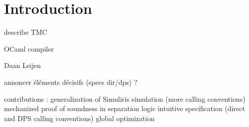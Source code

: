 \section{Introduction}

describe TMC

OCaml compiler

Daan Leijen

annoncer éléments décisifs (specs dir/dps) ?

contributions :
generalization of Simuliris simulation (more calling conventions)
mechanized proof of soundness in separation logic
intuitive specification (direct and DPS calling conventions)
global optimization




